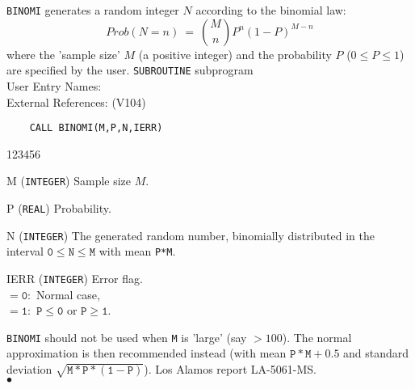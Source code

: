                              
                           
\Submitter{}                               
{\tt BINOMI} generates a random integer $N$ according to the
binomial law:
$$ Prob(N=n) \ = \ {M \choose n}  P^n (1-P)^{M-n} $$
where the 'sample size' $M$ (a positive integer) and the probability
$P$ ($0 \leq P \leq 1$) are specified by the user.
\Structure
{\tt SUBROUTINE} subprogram \\
User Entry Names: \\
External References:  (V104)
\Usage
\begin{verbatim}
    CALL BINOMI(M,P,N,IERR)
\end{verbatim}
\begin{DLtt}{123456}
\item [M] ({\tt INTEGER}) Sample size $M$.
\item [P] ({\tt REAL}) Probability.
\item [N]({\tt INTEGER}) The generated random number, binomially
distributed in the interval $\mathtt{0 \leq N \leq M}$ with mean
{\tt P*M}.
\item [IERR]({\tt INTEGER}) Error flag. \\
$\mathtt{= 0:}$ Normal case, \\
$\mathtt{= 1:}$ $\mathtt{P \leq 0}$ or $\mathtt{P \geq 1}$.
\end{DLtt}
\Notes
{\tt BINOMI} should not be used when {\tt M} is 'large' (say
$ >100 $). The normal approximation is then recommended instead (with
mean $\mathtt{P*M+0.5}$ and standard deviation
$\sqrt{\mathtt{M*P*(1-P)}}$).
\Source
Los Alamos report LA-5061-MS.
\\ $\bullet$
